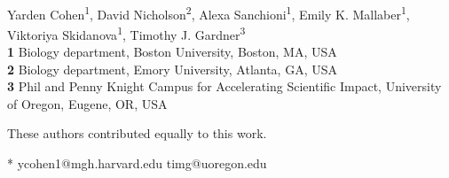 \documentclass[10pt,letterpaper]{article}
\newcommand{\todoycgr}[1]{
\todo[bordercolor=green, color=green!40, size=\small]{#1}
}
\newcommand{\todoycpu}[1]{
\todo[bordercolor=purple, color=purple!40, size=\small]{#1}
}
\newcommand{\tododnor}[1]{
\todo[bordercolor=orange, color=orange!40, size=\small]{#1}
}
\newcommand{\todotg}[1]{
\todo[bordercolor=yellow, color=yellow!40, size=\small]{#1}
}
\begin{document}
\vspace*{0.2in}

\begin{flushleft}
{\Large
\textbf{}
}
\newline
\\
Yarden Cohen\textsuperscript{1\Yinyang*},
David Nicholson\textsuperscript{2\Yinyang},
Alexa Sanchioni\textsuperscript{1},
Emily K. Mallaber\textsuperscript{1},
Viktoriya Skidanova\textsuperscript{1}, 
Timothy J. Gardner\textsuperscript{3\ddag}
\\
\bigskip
\textbf{1} Biology department, Boston University, Boston, MA, USA
\\
\textbf{2} Biology department, Emory University, Atlanta, GA, USA
\\
\textbf{3} Phil and Penny Knight Campus for Accelerating Scientific Impact, University of Oregon, Eugene, OR, USA
\\
\bigskip

% 
%
\Yinyang These authors contributed equally to this work.





* ycohen1@mgh.harvard.edu
\ddag timg@uoregon.edu
\end{flushleft}
\justify
\end{document}
